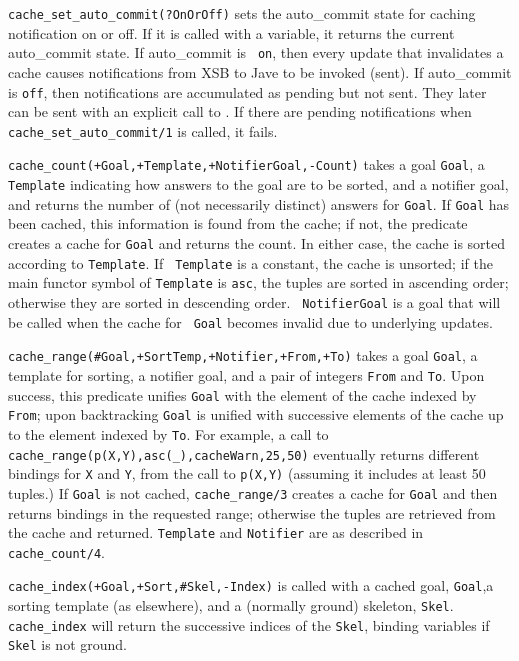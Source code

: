 \begin{description}
{\tt cache\_set\_auto\_commit(?OnOrOff)} sets the auto\_commit state
for caching notification on or off.  If it is called with a variable,
it returns the current auto\_commit state.  If auto\_commit is {\tt
on}, then every update that invalidates a cache causes notifications
from XSB to Jave to be invoked (sent).  If auto\_commit is {\tt off},
then notifications are accumulated as pending but not sent.  They
later can be sent with an explicit call to
.  If there are pending
notifications when {\tt cache\_set\_auto\_commit/1} is called, it
fails.

{\tt cache\_count(+Goal,+Template,+NotifierGoal,-Count)} takes a goal
{\tt Goal}, a {\tt Template} indicating how answers to the goal are to
be sorted, and a notifier goal, and returns the number of (not
necessarily distinct) answers for {\tt Goal}.  If {\tt Goal} has been
cached, this information is found from the cache; if not, the
predicate creates a cache for {\tt Goal} and returns the count.  In
either case, the cache is sorted according to {\tt Template}.  If {\tt
Template} is a constant, the cache is unsorted; if the main functor
symbol of {\tt Template} is {\tt asc}, the tuples are sorted in
ascending order; otherwise they are sorted in descending order.  {\tt
NotifierGoal} is a goal that will be called when the cache for {\tt
Goal} becomes invalid due to underlying updates.

{\tt cache\_range(\#Goal,+SortTemp,+Notifier,+From,+To)} takes a goal
{\tt Goal}, a template for sorting, a notifier goal, and a pair of
integers {\tt From} and {\tt To}.  Upon success, this predicate
unifies {\tt Goal} with the element of the cache indexed by {\tt
From}; upon backtracking {\tt Goal} is unified with successive
elements of the cache up to the element indexed by {\tt To}.  For
example, a call to {\tt cache\_range(p(X,Y),asc(\_),cacheWarn,25,50)}
eventually returns different bindings for {\tt X} and {\tt Y}, from
the call to {\tt p(X,Y)} (assuming it includes at least 50 tuples.)
If {\tt Goal} is not cached, {\tt cache\_range/3} creates a cache for
{\tt Goal} and then returns bindings in the requested range; otherwise
the tuples are retrieved from the cache and returned.  {\tt Template}
and {\tt Notifier} are as described in {\tt cache\_count/4}.

{\tt cache\_index(+Goal,+Sort,\#Skel,-Index)} is called with a cached
goal, {\tt Goal},a sorting template (as elsewhere), and a (normally
ground) skeleton, {\tt Skel}.  {\tt cache\_index} will return the
successive indices of the {\tt Skel}, binding variables if {\tt Skel}
is not ground.


\end{description}
